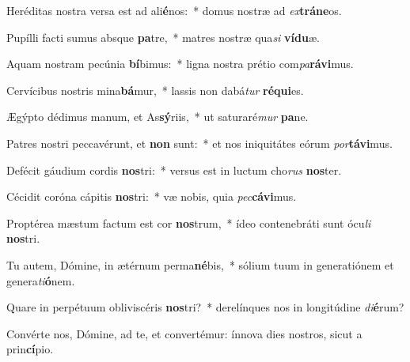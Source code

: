 \item Heréditas nostra versa est ad ali\textbf{é}nos:~* domus nostræ ad \textit{ex}\textbf{trá}\textbf{ne}os.
\item Pupílli facti sumus absque \textbf{pa}tre,~* matres nostræ qua\textit{si} \textbf{ví}\textbf{du}æ.
\item Aquam nostram pecúnia \textbf{bí}bimus:~* ligna nostra prétio com\textit{pa}\textbf{rá}\textbf{vi}mus.
\item Cervícibus nostris mina\textbf{bá}mur,~* lassis non dabá\textit{tur} \textbf{ré}\textbf{qui}es.
\item Ægýpto dédimus manum, et As\textbf{sý}riis,~* ut saturaré\textit{mur} \textbf{pa}ne.
\item Patres nostri peccavérunt, et \textbf{non} sunt:~* et nos iniquitátes eórum \textit{por}\textbf{tá}\textbf{vi}mus.
\item Defécit gáudium cordis \textbf{nos}tri:~* versus est in luctum cho\textit{rus} \textbf{nos}ter.
\item Cécidit coróna cápitis \textbf{nos}tri:~* væ nobis, quia \textit{pec}\textbf{cá}\textbf{vi}mus.
\item Proptérea mæstum factum est cor \textbf{nos}trum,~* ídeo contenebráti sunt ócu\textit{li} \textbf{nos}tri.
\item Tu autem, Dómine, in ætérnum perma\textbf{né}bis,~* sólium tuum in generatiónem et genera\textit{ti}\textbf{ó}nem.
\item Quare in perpétuum obliviscéris \textbf{nos}tri?~* derelínques nos in longitúdine \textit{di}\textbf{é}rum?
\item Convérte nos, Dómine, ad te, et convertémur: ínnova dies nostros, sicut a prin\textbf{cí}pio.
